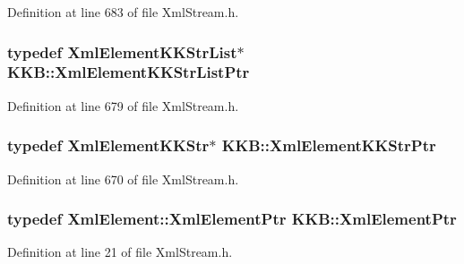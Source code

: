 Definition at line 683 of file Xml\+Stream.\+h.

\subsubsection[{\texorpdfstring{Xml\+Element\+K\+K\+Str\+List\+Ptr}{XmlElementKKStrListPtr}}]{\setlength{\rightskip}{0pt plus 5cm}typedef {\bf Xml\+Element\+K\+K\+Str\+List}$\ast$ {\bf K\+K\+B\+::\+Xml\+Element\+K\+K\+Str\+List\+Ptr}}\hypertarget{namespace_k_k_b_affffa9607088c1e3243e714ae30e163d}{}\label{namespace_k_k_b_affffa9607088c1e3243e714ae30e163d}


Definition at line 679 of file Xml\+Stream.\+h.

\subsubsection[{\texorpdfstring{Xml\+Element\+K\+K\+Str\+Ptr}{XmlElementKKStrPtr}}]{\setlength{\rightskip}{0pt plus 5cm}typedef {\bf Xml\+Element\+K\+K\+Str}$\ast$ {\bf K\+K\+B\+::\+Xml\+Element\+K\+K\+Str\+Ptr}}\hypertarget{namespace_k_k_b_a73ff4cfe89efeb8a79c57512bcb503d0}{}\label{namespace_k_k_b_a73ff4cfe89efeb8a79c57512bcb503d0}


Definition at line 670 of file Xml\+Stream.\+h.

\subsubsection[{\texorpdfstring{Xml\+Element\+Ptr}{XmlElementPtr}}]{\setlength{\rightskip}{0pt plus 5cm}typedef {\bf Xml\+Element\+::\+Xml\+Element\+Ptr} {\bf K\+K\+B\+::\+Xml\+Element\+Ptr}}\hypertarget{namespace_k_k_b_a60c0ababc47c146b900507f7a3d3872e}{}\label{namespace_k_k_b_a60c0ababc47c146b900507f7a3d3872e}


Definition at line 21 of file Xml\+Stream.\+h.

